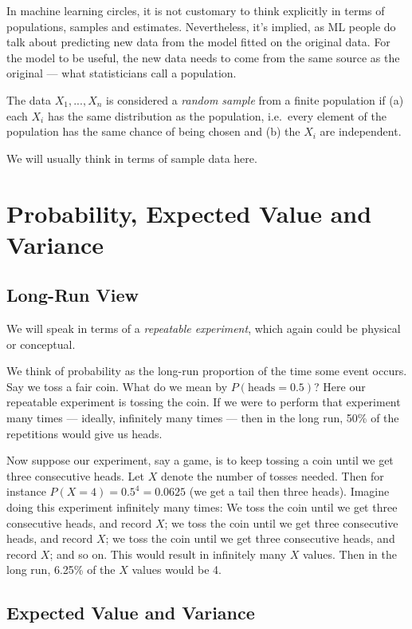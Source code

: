In machine learning circles, it is not customary to think explicitly in
terms of populations, samples and estimates.  Nevertheless, it's
implied, as ML people do talk about predicting new data from the model
fitted on the original data.  For the model to be useful, the new data
needs to come from the same source as the original --- what
statisticians call a population.

The data $X_1,...,X_n$ is considered a \textit{random sample} from a
finite population if (a) each $X_i$ has the same distribution as the
population, i.e.\ every element of the population has the same chance of
being chosen and (b) the $X_i$ are independent.  

We will usually think in terms of sample data here.

\section{Probability, Expected Value and Variance}

\subsection{Long-Run View}

We will speak in terms of a \textit{repeatable experiment}, which again
could be physical or conceptual.

We think of probability as the long-run proportion of the time some
event occurs.  Say we toss a fair coin.  What do we mean by
$P(\textrm{heads} = 0.5)$?  Here our repeatable experiment is tossing the
coin.  If we were to perform that experiment many times ---
ideally, infinitely many times --- then in the long run, 50\% of the
repetitions would give us heads.

Now suppose our experiment, say a game, is to keep tossing a coin until
we get three consecutive heads.  Let $X$ denote the number of tosses
needed.  Then for instance $P(X = 4) = 0.5^4 = 0.0625$ (we get a tail
then three heads).  Imagine doing this experiment infinitely many times:
We toss the coin until we get three consecutive heads, and record $X$;
we toss the coin until we get three consecutive heads, and record $X$;
we toss the coin until we get three consecutive heads, and record $X$;
and so on.  This would result in infinitely many $X$ values.  Then in
the long run, 6.25\% of the $X$ values would be 4.

\subsection{Expected Value and Variance}

